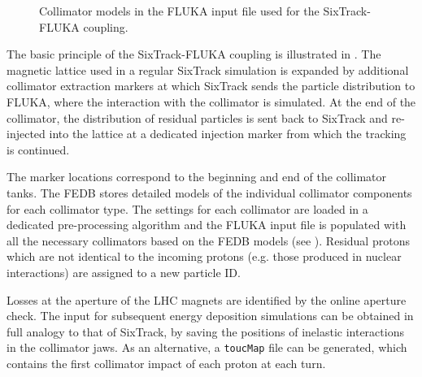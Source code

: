 \begin{figure}[t]
  \centering
  \caption{Collimator models in the FLUKA input file used for the SixTrack-FLUKA coupling.}  
  \label{pic:16070701}
  \end{figure}



The basic principle of the SixTrack-FLUKA coupling is illustrated in . The magnetic lattice used in a regular SixTrack simulation is expanded by additional collimator extraction markers at which \mbox{SixTrack} sends the particle distribution to FLUKA, where the interaction with the collimator is simulated. At the end of the collimator, the distribution of residual particles is sent back to SixTrack and re-injected into the lattice at a dedicated injection marker from which the tracking is continued. 

The marker locations correspond to the beginning and end of the collimator tanks. The FEDB stores detailed models of the individual collimator components for each collimator type. The settings for each collimator are loaded in a dedicated pre-processing algorithm and the FLUKA input file is populated with all the necessary collimators based on the FEDB models (see ). Residual protons which are not identical to the incoming protons (e.g. those produced in nuclear interactions) are assigned to a new particle ID. 

Losses at the aperture of the LHC magnets are identified by the online aperture check. The input for subsequent energy deposition simulations can be obtained in full analogy to that of SixTrack, by saving the positions of inelastic interactions in the collimator jaws.  As an alternative, a \texttt{toucMap} file can be generated, which contains the first collimator impact of each proton at each turn.


